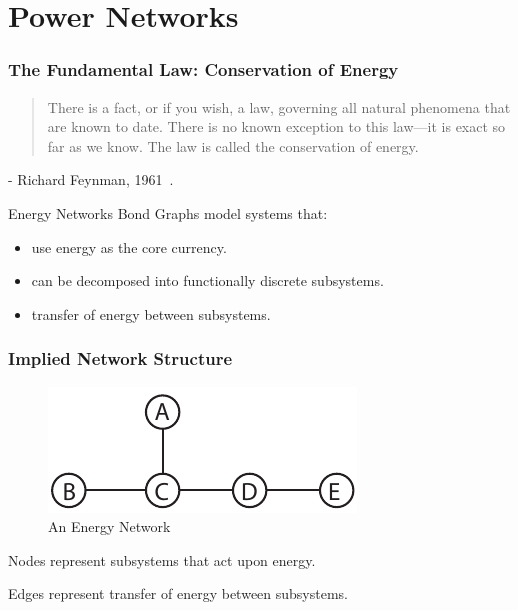 \documentclass[12pt,reqno]{beamer}
\begin{document}
\section{Power Networks}
\begin{frame}
\frametitle{The Fundamental Law: Conservation of Energy}
\begin{quotation}
	There is a fact, or if you wish, a law, governing all natural phenomena that are known to date. There is no known exception to this law—it is exact so far as we know. The law is called the conservation of energy.
\end{quotation}

- Richard Feynman, 1961~\cite{Feynman1961}.
\end{frame}
\begin{frame}{Energy Networks}
Bond Graphs model systems that:
\begin{itemize}
	\item use energy as the core currency.
	\item can be decomposed into functionally discrete subsystems.
	\item transfer of energy between subsystems.
\end{itemize}

\end{frame}
\begin{frame}
\frametitle{Implied Network Structure}
\begin{figure}
	\centering
	\includegraphics{network_1.pdf}
	\caption{An Energy Network}
\end{figure}
Nodes represent subsystems that act upon energy.

\vspace{5pt}

Edges represent transfer of energy between subsystems.
\end{frame}
\end{document}
